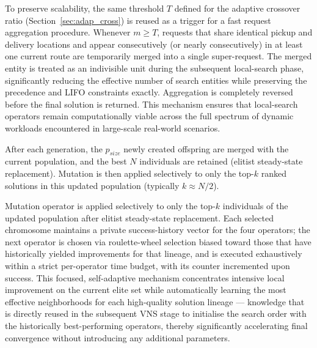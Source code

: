 \documentclass[preprint,12pt]{elsarticle}
\begin{document}
To preserve scalability, the same threshold $T$ defined for the adaptive crossover ratio (Section~\ref{sec:adap_cross}) is reused as a trigger for a fast request aggregation  procedure. Whenever $m \ge T$, requests that share identical pickup and delivery locations and appear consecutively (or nearly consecutively) in at least one current route are temporarily merged into a single super-request. The merged entity is treated as an indivisible unit during the subsequent local-search phase, significantly reducing the effective number of search entities while preserving the precedence and LIFO constraints exactly. Aggregation is completely reversed before the final solution is returned. This mechanism ensures that local-search operators remain computationally viable across the full spectrum of dynamic workloads encountered in large-scale real-world scenarios.




After each generation, the $p_{size}$ newly created offspring are merged with the current population, and the best $N$ individuals are retained (elitist steady-state replacement). Mutation is then applied selectively to only the top-$k$ ranked solutions in this updated population (typically $k \approx N/2$).

Mutation operator is applied selectively to only the top-$k$ individuals of the updated population after elitist steady-state replacement. Each selected chromosome maintains a private success-history vector for the four operators; the next operator is chosen via roulette-wheel selection biased toward those that have historically yielded improvements for that lineage, and is executed exhaustively within a strict per-operator time budget, with its counter incremented upon success. This focused, self-adaptive mechanism concentrates intensive local improvement on the current elite set while automatically learning the most effective neighborhoods for each high-quality solution lineage — knowledge that is directly reused in the subsequent VNS stage to initialise the search order with the historically best-performing operators, thereby significantly accelerating final convergence without introducing any additional parameters.
\end{document}
